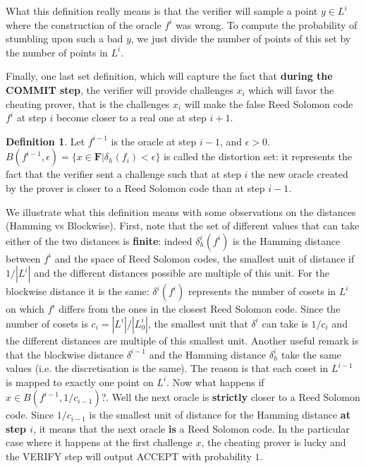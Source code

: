 \documentclass[12pt]{extarticle}
\newcommand{\<}{\langle}
\renewcommand{\>}{\rangle}
\theoremstyle{definition}
\newtheorem{defn}{Definition}
\begin{document}
What this definition really means is that the verifier will sample a point $y\in L^i$ where the construction of the oracle $f^i$ was wrong. To compute the probability of stumbling upon such a bad $y$, we just divide the number of points of this set by the number of points in $L^i$.

Finally, one last set definition, which will capture the fact that \textbf{during the COMMIT step}, the verifier will provide challenges $x_i$ which will favor the cheating prover, that is the challenges $x_i$ will make the false Reed Solomon code $f^i$ at step $i$ become closer to a real one at step $i+1$.

\begin{defn}
Let $f^{i-1}$ is the oracle at step $i-1$, and $\epsilon>0$. $B(f^{i-1},\epsilon)=\{x\in\mathbf{F}|\delta_h(f_i)<\epsilon\}$ is called the distortion set: it represents the fact that the verifier sent a challenge such that at step $i$ the new oracle created by the prover is closer to a Reed Solomon code than at step $i-1$.
\end{defn}
We illustrate what this definition means with some observations on the distances (Hamming vs Blockwise). First, note that the set of different values that can take either of the two distances is \textbf{finite}: indeed $\delta^i_h(f^i)$ is the Hamming distance between $f^i$ and the space of Reed Solomon codes, the smallest unit of distance if $1/|L^i|$ and the different distances possible are multiple of this unit. For the blockwise distance it is the same: $\delta^i(f^i)$ represents the number of cosets in $L^i$ on which $f^i$ differs from the ones in the closest Reed Solomon code. Since the number of cosets is $c_i=|L^i|/|L^i_0|$, the smallest unit that $\delta^i$ can take is $1/c_i$ and the different distances are multiple of this smallest unit. Another useful remark is that the blockwise distance $\delta^{i-1}$ and the Hamming distance $\delta^i_h$ take the same values (i.e. the discretisation is the same). The reason is that each coset in $L^{i-1}$ is mapped to exactly one point on $L^i$. Now what happens if $x\in B(f^{i-1},1/c_{i-1})$?. Well the next oracle is \textbf{strictly} closer to a Reed Solomon code. Since $1/c_{i-1}$ is the smallest unit of distance for the Hamming distance \textbf{at step $i$}, it means that the next oracle \textbf{is} a Reed Solomon code. In the particular case where it happens at the first challenge $x$, the cheating prover is lucky and the VERIFY step will output ACCEPT with probability $1$.
\end{document}
